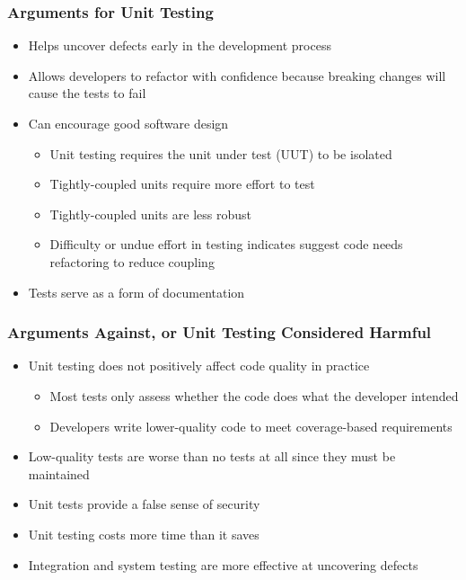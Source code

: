 \documentclass{beamer}
\begin{document}
\begin{frame}
\frametitle{Arguments for Unit Testing}
\begin{itemize}
	\item Helps uncover defects early in the development process
	\item Allows developers to refactor with confidence because breaking changes will cause the tests to fail
	\item Can encourage good software design
	\begin{itemize}
		\item Unit testing requires the unit under test (UUT) to be isolated
		\item Tightly-coupled units require more effort to test
		\item Tightly-coupled units are less robust
		\item Difficulty or undue effort in testing indicates suggest code needs refactoring to reduce coupling
	\end{itemize}
	\item Tests serve as a form of documentation
\end{itemize}
\end{frame}

\begin{frame}
\frametitle{Arguments Against, or Unit Testing Considered Harmful}
\begin{itemize}
	\item Unit testing does not positively affect code quality in practice
	\begin{itemize}
		\item Most tests only assess whether the code does what the developer intended
		\item Developers write lower-quality code to meet coverage-based requirements
	\end{itemize}
	\item Low-quality tests are worse than no tests at all since they must be maintained
	\item Unit tests provide a false sense of security
	\item Unit testing costs more time than it saves
	\item Integration and system testing are more effective at uncovering defects
\end{itemize}
\end{frame}
\end{document}

